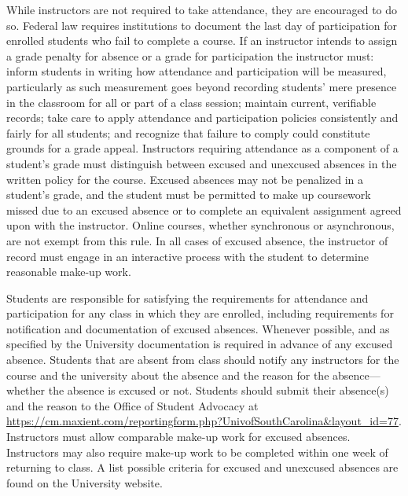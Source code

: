 \documentclass[11pt,letterpaper]{article}
\begin{document}
While instructors are not required to take attendance, they are encouraged to do so. Federal law requires institutions to document the last day of participation for enrolled students who fail to complete a course. If an instructor intends to assign a grade penalty for absence or a grade for participation the instructor must: inform students in writing how attendance and participation will be measured, particularly as such measurement goes beyond recording students' mere presence in the classroom for all or part of a class session; maintain current, verifiable records; take care to apply attendance and participation policies consistently and fairly for all students; and recognize that failure to comply could constitute grounds for a grade appeal. Instructors requiring attendance as a component of a student’s grade must distinguish between excused and unexcused absences in the written policy for the course. Excused absences may not be penalized in a student’s grade, and the student must be permitted to make up coursework missed due to an excused absence or to complete an equivalent assignment agreed upon with the instructor. Online courses, whether synchronous or asynchronous, are not exempt from this rule. In all cases of excused absence, the instructor of record must engage in an interactive process with the student to determine reasonable make-up work. \pspace

Students are responsible for satisfying the requirements for attendance and participation for any class in which they are enrolled, including requirements for notification and documentation of excused absences. Whenever possible, and as specified by the University documentation is required in advance of any excused absence. Students that are absent from class should notify any instructors for the course and the university about the absence and the reason for the absence---whether the absence is excused or not. Students should submit their absence(s) and the reason to the Office of Student Advocacy at \url{https://cm.maxient.com/reportingform.php?UnivofSouthCarolina\&layout_id=77}. Instructors must allow comparable make-up work for excused absences. Instructors may also require make-up work to be completed within one week of returning to class. A list possible criteria for excused and unexcused absences are found on the University website. \pspace
\end{document}

